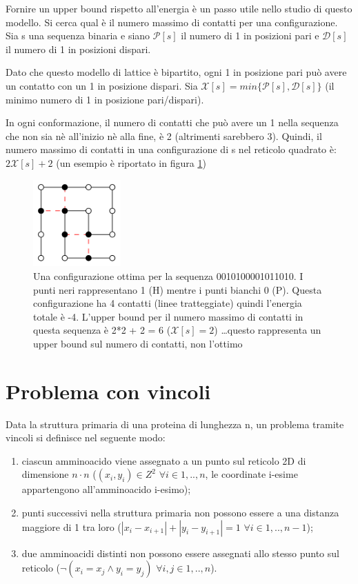 \documentclass[twocolumn,10pt]{asme2ej}
\newcommand{\abs}[1]{\left|#1\right|}
\begin{document}
Fornire un upper bound rispetto all'energia è un passo utile nello studio di questo modello. Si cerca qual è il numero massimo di contatti per una configurazione. Sia s una sequenza binaria e siano $\mathcal{P}[s]$ il numero di 1 in posizioni pari e $\mathcal{D}[s]$ il numero di 1 in posizioni dispari.

Dato che questo modello di lattice è bipartito, ogni 1 in posizione pari può avere un contatto con un 1 in posizione dispari. Sia $\mathcal{X}[s] = min\{\mathcal{P}[s], \mathcal{D}[s]\}$ (il minimo numero di 1 in posizione pari/dispari).

In ogni conformazione, il numero di contatti che può avere un 1 nella sequenza che non sia nè all'inizio nè alla fine, è 2 (altrimenti sarebbero 3). Quindi, il numero massimo di contatti in una configurazione di s nel reticolo quadrato è: $2 \mathcal{X}[s] + 2$ (un esempio è riportato in figura \ref{fig:optConfig})

\begin{figure}[h]
\centering
\includegraphics[width=0.3\textwidth]{figure/optConfig}
\caption{Una configurazione ottima per la sequenza 0010100001011010. I punti neri rappresentano 1 (H) mentre i punti bianchi 0 (P). Questa configurazione ha 4 contatti (linee tratteggiate) quindi l'energia totale è -4. L'upper bound per il numero massimo di contatti in questa sequenza è 2*2 + 2 = 6 ($\mathcal{X}[s] = 2$) \dots questo rappresenta un upper bound sul numero di contatti, non l'ottimo}
\label{fig:optConfig}
\end{figure}

\section{Problema con vincoli}

Data la struttura primaria di una proteina di lunghezza n, un problema tramite vincoli si definisce nel seguente modo:

\begin{enumerate}
 \item ciascun amminoacido viene assegnato a un punto sul reticolo 2D di dimensione $n \cdot n$ ($(x_i, y_i) \in Z^2$ $\forall i \in 1,..,n$, le coordinate i-esime appartengono all'amminoacido i-esimo);
 \item punti successivi nella struttura primaria non possono essere a una distanza maggiore di 1 tra loro ($\abs{x_i - x_{i+1}} + \abs{y_i - y_{i+1}} = 1 $ $\forall i \in 1,..,n-1$);
 \item due amminoacidi distinti non possono essere assegnati allo stesso punto sul reticolo ($ \neg (x_i = x_j \land y_i = y_j)$ $\forall i,j \in 1,..,n$).
\end{enumerate}
\end{document}
